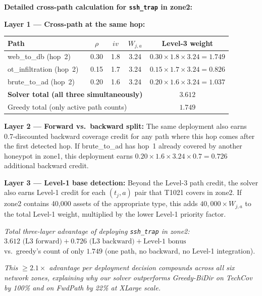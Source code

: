 \documentclass[journal]{IEEEtran}
\begin{document}
\begin{examplebox}
\textbf{Detailed cross-path calculation for
\texttt{ssh\_trap} in zone2:}

\medskip
\noindent\textbf{Layer 1 --- Cross-path at the same hop:}
\begin{center}
\small
\renewcommand{\arraystretch}{1.15}
\begin{tabular}{@{}lcccc@{}}
\toprule
\textbf{Path} & $\rho$ & $iv$ & $W_{j,a}$ & \textbf{Level-3 weight}\\
\midrule
web\_to\_db (hop~2)     & 0.30 & 1.8 & 3.24 & $0.30\times1.8\times3.24=\mathbf{1.749}$ \\
ot\_infiltration (hop~2)& 0.15 & 1.7 & 3.24 & $0.15\times1.7\times3.24=\mathbf{0.826}$ \\
brute\_to\_ad (hop~2)   & 0.20 & 1.6 & 3.24 & $0.20\times1.6\times3.24=\mathbf{1.037}$ \\
\midrule
\multicolumn{4}{l}{\textbf{Solver total (all three simultaneously)}}
  & $\mathbf{3.612}$ \\
\multicolumn{4}{l}{Greedy total (only active path counts)}
  & $\mathbf{1.749}$ \\
\bottomrule
\end{tabular}
\end{center}

\noindent\textbf{Layer 2 --- Forward vs.\ backward split:}
The same deployment also earns 0.7-discounted backward
coverage credit for any path where this hop comes after the
first detected hop.
If brute\_to\_ad has hop~1 already covered by another
honeypot in zone1, this deployment earns $0.20 \times 1.6
\times 3.24 \times 0.7 = \mathbf{0.726}$ additional
backward credit.

\noindent\textbf{Layer 3 --- Level-1 base detection:}
Beyond the Level-3 path credit, the solver also earns
Level-1 credit for each $(t_j, a)$ pair that T1021 covers
in zone2.
If zone2 contains 40,000 assets of the appropriate type,
this adds $40{,}000 \times W_{j,a}$ to the total Level-1
weight, multiplied by the lower Level-1 priority factor.

\medskip
\textit{Total three-layer advantage of deploying
\texttt{ssh\_trap} in zone2:}\\
$3.612 \text{ (L3 forward)} + 0.726 \text{ (L3 backward)}
+ \text{Level-1 bonus}$\\
vs.\ greedy's count of only $1.749$ (one path, no backward,
no Level-1 integration).

\textit{This $\geq 2.1\times$ advantage per deployment
decision compounds across all six network zones, explaining
why our solver outperforms Greedy-BiDir on TechCov by 100\%
and on FwdPath by 22\% at XLarge scale.}
\end{examplebox}
\end{document}

